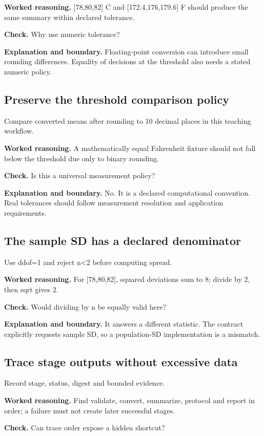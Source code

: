 \textbf{Worked reasoning.} [78,80,82] C and [172.4,176,179.6] F should produce the same summary within declared tolerance.

\textbf{Check.} Why use numeric tolerance?

\textbf{Explanation and boundary.} Floating-point conversion can introduce small rounding differences. Equality of decisions at the threshold also needs a stated numeric policy.

\subsection{Preserve the threshold comparison policy}
Compare converted means after rounding to 10 decimal places in this teaching workflow.

\textbf{Worked reasoning.} A mathematically equal Fahrenheit fixture should not fall below the threshold due only to binary rounding.

\textbf{Check.} Is this a universal measurement policy?

\textbf{Explanation and boundary.} No. It is a declared computational convention. Real tolerances should follow measurement resolution and application requirements.

\subsection{The sample SD has a declared denominator}
Use ddof=1 and reject n<2 before computing spread.

\textbf{Worked reasoning.} For [78,80,82], squared deviations sum to 8; divide by 2, then sqrt gives 2.

\textbf{Check.} Would dividing by n be equally valid here?

\textbf{Explanation and boundary.} It answers a different statistic. The contract explicitly requests sample SD, so a population-SD implementation is a mismatch.

\subsection{Trace stage outputs without excessive data}
Record stage, status, digest and bounded evidence.

\textbf{Worked reasoning.} Find validate, convert, summarize, protocol and report in order; a failure must not create later successful stages.

\textbf{Check.} Can trace order expose a hidden shortcut?

